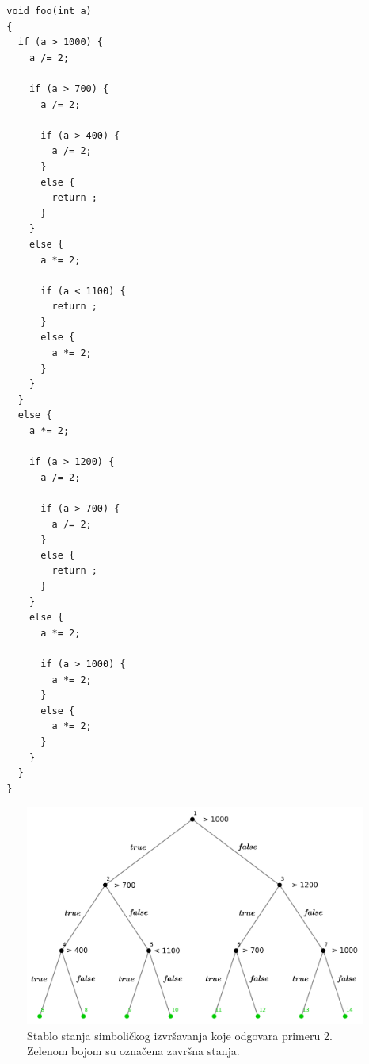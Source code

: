 \documentclass[12pt]{article}
\begin{document}
\begin{lstlisting}
  void foo(int a) 
  {
    if (a > 1000) {
      a /= 2;

      if (a > 700) {
        a /= 2;

        if (a > 400) {
          a /= 2;
        }
        else {
          return ;
        }
      }
      else {
        a *= 2;

        if (a < 1100) {
          return ;
        }
        else {
          a *= 2;
        }
      }
    }
    else {
      a *= 2;

      if (a > 1200) {
        a /= 2;

        if (a > 700) {
          a /= 2;
        }
        else {
          return ;
        }
      }
      else {
        a *= 2;

        if (a > 1000) {
          a *= 2;
        }
        else {
          a *= 2;
        }
      }
    }
  }
\end{lstlisting}
\newpage
\begin{figure}[ht]
    \centering
    \includegraphics[width=0.85\linewidth]{stablo_primer_1.png}
    \caption{Stablo stanja simboličkog izvršavanja koje odgovara primeru 2. Zelenom bojom su označena završna stanja.}
    \label{fig:moj_primer}
\end{figure}
\newpage
\end{document}
